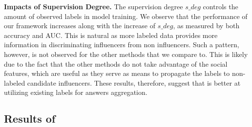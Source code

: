 \smallskip
\noindent\textbf{Impacts of Supervision Degree.} The supervision degree $s\_deg$ controls the amount of observed labels in model training. We observe that the performance of our framework increases along with the increase of $s\_deg$, as measured by both accuracy and AUC. This is natural as more labeled data provides more information in discriminating influencers from non influencers. Such a pattern, however, is not observed for the other methods that we compare to. This is likely due to the fact that the other methods do not take advantage of the social features, which are useful as they serve as means to propagate the labels to non-labeled candidate influencers. These results, therefore, suggest that \sys is better at utilizing existing labels for answers aggregation. 

\subsection{Results of \sys}
\label{sec:selfres}

